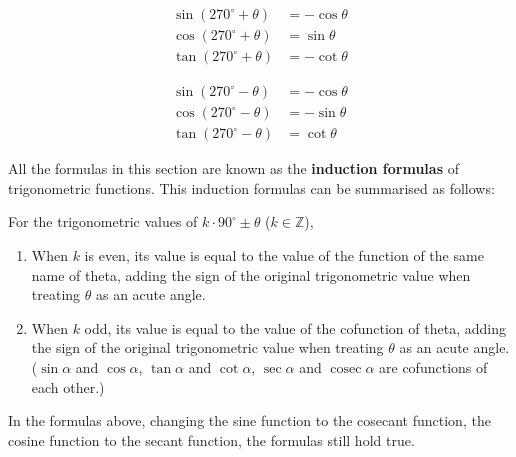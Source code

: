 \documentclass{report}
\begin{document}
\begin{multicols}{2}
    \parbox{0.41\textwidth}{\begin{info}
        \begin{align*}
            \sin(270^{\circ} + \theta) &= -\cos \theta\\
            \cos(270^{\circ} + \theta) &= \sin \theta\\
            \tan(270^{\circ} + \theta) &= -\cot \theta
        \end{align*}
    \end{info}}
    \parbox{0.41\textwidth}{\begin{info}
        \begin{align*}
            \sin(270^{\circ} - \theta) &= -\cos \theta\\
            \cos(270^{\circ} - \theta) &= -\sin \theta\\
            \tan(270^{\circ} - \theta) &= \cot \theta
        \end{align*}
    \end{info}}
\end{multicols}

All the formulas in this section are known as the \textbf{induction formulas} of trigonometric functions. This induction formulas can be summarised as follows:

\noindent For the trigonometric values of $k \cdot 90^\circ \pm \theta$ ($k \in \mathbb{Z}$),
\vspace{-1em}
\begin{enumerate}[label=(\roman*)]
    \item When $k$ is even, its value is equal to the value of the function of the same name of theta, adding the sign of the original trigonometric value when treating $\theta$ as an acute angle.
    \item When $k$ odd, its value is equal to the value of the cofunction of theta, adding the sign of the original trigonometric value when treating $\theta$ as an acute angle. ($\sin\alpha$ and $\cos\alpha$, $\tan\alpha$ and $\cot\alpha$, $\sec\alpha$ and $\operatorname{cosec}\alpha$ are cofunctions of each other.)
\end{enumerate}

In the formulas above, changing the sine function to the cosecant function, the cosine function to the secant function, the formulas still hold true. 
\end{document}
